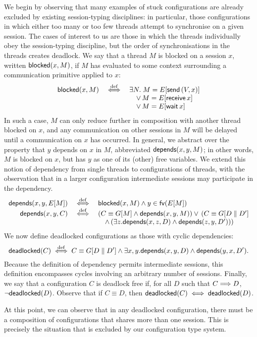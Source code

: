 \documentclass[oribibl,orivec,envcountsame]{llncs}
\begin{document}
We begin by observing that many examples of stuck configurations are already excluded by existing
session-typing disciplines: in particular, those configurations in which either too many or too few
threads attempt to synchronise on a given session.  The cases of interest to us are those in which
the threads individually obey the session-typing discipline, but the order of synchronisations in
the threads creates deadlock.  We say that a thread $M$ is blocked on a session $x$, written
$\mathsf{blocked}(x,M)$, if $M$ has evaluated to some context surrounding a communication primitive applied
to $x$:
%
\[\begin{array}{rcl}
  \mathsf{blocked}(x,M) &\stackrel{\mathrm{def}}{\iff}& \exists N. \; M = E[\mathsf{send} \, (V,x)] \\
  && \quad \lor \, M = E[\mathsf{receive} \, x] \\
  && \quad \lor \, M = E[\mathsf{wait} \, x]
\end{array}\]
%
In such a case, $M$ can only reduce further in composition with another thread blocked on $x$, and
any communication on other sessions in $M$ will be delayed until a communication on $x$ has
occurred. In general, we abstract over the property that $y$ depends on $x$ in $M$, abbreviated
$\mathsf{depends}(x,y,M)$; in other words, $M$ is blocked on $x$, but has $y$ as one of its (other) free
variables. We extend this notion of dependency from single threads to configurations of threads,
with the observation that in a larger configuration intermediate sessions may participate in the
dependency.
\[\begin{array}{rcl}
  \mathsf{depends}(x,y,E[M]) &\stackrel{\mathrm{def}}{\iff}& \mathsf{blocked}(x,M) \land y \in \mathsf{fv}(E[M]) \\
  \mathsf{depends}(x,y,C) &\stackrel{\mathrm{def}}{\iff}& (C \equiv G[M] \land \mathsf{depends}(x,y,M)) \lor \, (C \equiv G[D \parallel D'] \\
  && \quad \land \, (\exists z. \mathsf{depends}(x,z,D) \land \mathsf{depends}(z,y,D')))
\end{array}\]
%
We now define deadlocked configurations as those with cyclic dependencies:
%
\[
\mathsf{deadlocked}(C) \stackrel{\mathrm{def}}{\iff} C \equiv G[D \parallel D'] \land \exists x,y. \mathsf{depends}(x,y,D) \land \mathsf{depends}(y,x,D').
\]
%
Because the definition of dependency permits intermediate sessions, this definition encompasses
cycles involving an arbitrary number of sessions.  Finally, we say that a configuration $C$ is
deadlock free if, for all $D$ such that $C \Longrightarrow D$, $\lnot\mathsf{deadlocked}(D)$.  Observe that if
$C \equiv D$, then $\mathsf{deadlocked}(C) \iff \mathsf{deadlocked}(D)$.

At this point, we can observe that in any deadlocked configuration, there must be a composition of
configurations that shares more than one session.  This is precisely the situation that is excluded
by our configuration type system.
\end{document}
